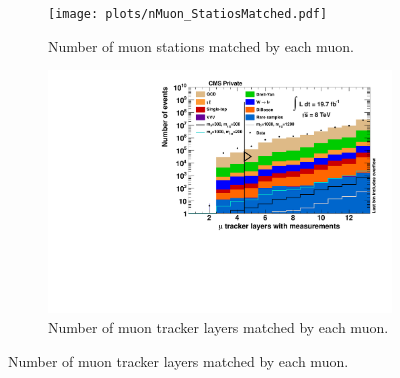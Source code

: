 \begin{figure}[!htbp]
  \ContinuedFloat
  \centering
  \begin{subfigure}[b]{0.495\textwidth}
    \centering
    \texttt{[image: plots/nMuon\_StatiosMatched.pdf]}
    \caption{Number of muon stations matched by each muon.\label{fig:muo_hits}}
  \end{subfigure}
  \begin{subfigure}[b]{0.495\textwidth}
    \centering
    \includegraphics[width=\textwidth]{plots/nMuon_TrackerLayers.pdf}
    \caption{Number of muon tracker layers matched by each muon.\label{fig:muo_stationsmatched}}
  \end{subfigure}
\end{figure}

